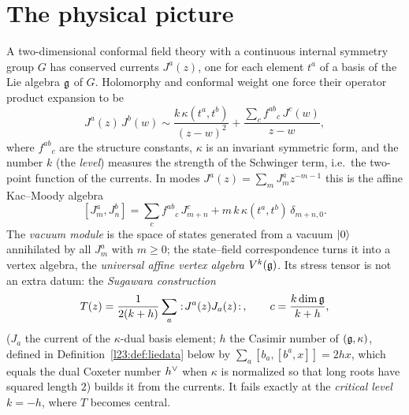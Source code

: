 \section{The physical picture}\label{l23:sec:physics}

A two-dimensional conformal field theory with a continuous internal symmetry group $G$ has conserved currents
$J^a(z)$, one for each element $t^a$ of a basis of the Lie algebra $\mathfrak g$ of $G$. Holomorphy and
conformal weight one force their operator product expansion to be
\begin{equation}\label{l23:eq:JJ}
J^a(z)\,J^b(w)\sim \frac{k\,\kappa(t^a,t^b)}{(z-w)^2}+\frac{\sum_c f^{ab}{}_c\,J^c(w)}{z-w},
\end{equation}
where $f^{ab}{}_c$ are the structure constants, $\kappa$ is an invariant symmetric form, and the number $k$ (the
\emph{level}) measures the strength of the Schwinger term, i.e.\ the two-point function of the currents. In
modes $J^a(z)=\sum_m J^a_m z^{-m-1}$ this is the affine Kac--Moody algebra
\begin{equation}\label{l23:eq:affine}
[J^a_m,J^b_n]=\sum_c f^{ab}{}_c\,J^c_{m+n}+m\,k\,\kappa(t^a,t^b)\,\delta_{m+n,0}.
\end{equation}
The \emph{vacuum module} is the space of states generated from a vacuum $|0\rangle$ annihilated by all
$J^a_m$ with $m\ge0$; the state--field correspondence turns it into a vertex algebra, the \emph{universal affine
vertex algebra} $V^k(\mathfrak g)$. Its stress tensor is not an extra datum: the \emph{Sugawara construction}
\begin{equation}\label{l23:eq:sugawara}
T(z)=\frac{1}{2(k+h)}\sum_{a}:\!J^{a}(z)J_{a}(z)\!:\,,\qquad c=\frac{k\dim\mathfrak g}{k+h},
\end{equation}
($J_a$ the current of the $\kappa$-dual basis element; $h$ the Casimir number of $(\mathfrak g,\kappa)$, defined in
Definition~\ref{l23:def:liedata} below by $\sum_a[b_a,[b^a,x]]=2hx$, which equals the dual Coxeter number $h^\vee$ when $\kappa$ is
normalized so that long roots have squared length $2$) builds it from the currents. It fails exactly at the \emph{critical level} $k=-h$, where $T$ becomes central.

